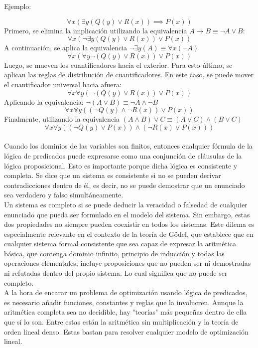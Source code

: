 \documentclass[12pt]{report}
\begin{document}
Ejemplo:

$$\forall x(\exists y(Q(y)\lor R(x))\implies P(x))$$
Primero, se elimina la implicación utilizando la equivalencia $A→B\equiv \neg A\lor B$:
$$\forall x(\neg\exists y(Q(y)\lor R(x)) \lor  P(x))$$
A continuación, se aplica la equivalencia $\neg\exists y(A)\equiv \forall x(\neg A)$
$$\forall x(\forall y\neg(Q(y)\lor R(x)) \lor  P(x))$$
Luego, se mueven los cuantificadores hacia el exterior. Para esto último, se aplican las reglas de distribución de cuantificadores. En este caso, se puede mover el cuantificador universal hacia afuera:
$$\forall x\forall y(\neg(Q(y)\lor R(x))\lor  P(x))$$
Aplicando la equivalencia: $\neg(A\lor B)\equiv \neg A\land\neg B$
$$\forall x\forall y((\neg Q(y)\land\neg R(x))\lor  P(x))$$
Finalmente, utilizando la equivalencia $(A\land B)\lor C\equiv (A\lor C)\land(B\lor C)$
$$\forall x\forall y((\neg Q(y)\lor  P(x))\land(\neg R(x)\lor  P(x)))$$\\

Cuando los dominios de las variables son finitos, entonces cualquier fórmula de la lógica de predicados puede expresarse como una conjunción de cláusulas de la lógica proposicional. Esto es importante porque dicha lógica es consistente y completa. Se dice que un sistema es consistente si no se pueden derivar contradicciones dentro de él, es decir, no se puede demostrar que un enunciado sea verdadero y falso simultáneamente. \\

Un sistema es completo si se puede deducir la veracidad o falsedad de cualquier enunciado que pueda ser formulado en el modelo del sistema. Sin embargo, estas dos propiedades no siempre pueden coexistir en todos los sistemas. Este dilema es especialmente relevante en el contexto de la teoría de Gödel, que establece que en cualquier sistema formal consistente que sea capaz de expresar la aritmética básica, que contenga dominio infinito, principio de inducción y todas las operaciones elementales; incluye proposiciones que no pueden ser ni demostradas ni refutadas dentro del propio sistema. Lo cual significa que no puede ser completo.\\

A la hora de encarar un problema de optimización usando lógica de predicados, es necesario añadir funciones, constantes y reglas que la involucren. Aunque la aritmética completa sea no decidible, hay "teorías" más pequeñas dentro de ella que sí lo son. Entre estas están la aritmética sin multiplicación y la teoría de orden lineal denso. Estas bastan para resolver cualquier modelo de optimización lineal.\\
\end{document}
